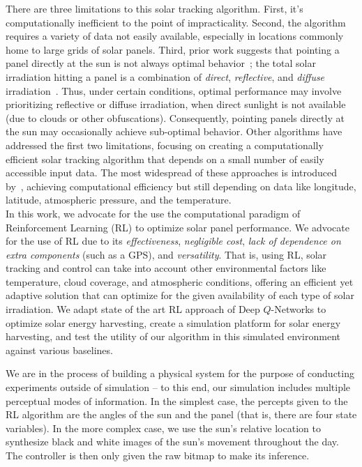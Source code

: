 \documentclass[11pt]{article}
\begin{document}
There are three limitations to this solar tracking algorithm. First, it's computationally inefficient to the point of impracticality. Second, the algorithm requires a variety of data not easily available, especially in locations commonly home to large grids of solar panels. Third, prior work suggests that pointing a panel directly at the sun is not always optimal behavior~\citet{Kelly2009,Hussein1995,King2001}; the total solar irradiation hitting a panel is a combination of {\it direct}, {\it reflective}, and {\it diffuse} irradiation~\cite{Benghanem2011}. Thus, under certain conditions, optimal performance may involve prioritizing reflective or diffuse irradiation, when direct sunlight is not available (due to clouds or other obfuscations). Consequently, pointing panels directly at the sun may  occasionally achieve sub-optimal behavior. Other algorithms have addressed the first two limitations, focusing on creating a computationally efficient solar tracking algorithm that depends on a small number of easily accessible input data. The most widespread of these approaches is introduced by~\citet{Grena2008}, achieving computational efficiency but still depending on data like longitude, latitude, atmospheric pressure, and the temperature. \\ 

In this work, we advocate for the use the computational paradigm of Reinforcement Learning (RL) to optimize solar panel performance. We advocate for the use of RL due to its {\it effectiveness}, {\it negligible cost}, {\it lack of dependence on extra components} (such as a GPS), and {\it versatility}. That is, using RL, solar tracking and control can take into account other environmental factors like temperature, cloud coverage, and atmospheric conditions, offering an efficient yet adaptive solution that can optimize for the given availability of each type of solar irradiation. We adapt state of the art RL approach of Deep $Q$-Networks to optimize solar energy harvesting, create a simulation platform for solar energy harvesting, and test the utility of our algorithm in this simulated environment against various baselines.

We are in the process of building a physical system for the purpose of conducting experiments outside of simulation -- to this end, our simulation includes multiple perceptual modes of information. In the simplest case, the percepts given to the RL algorithm are the angles of the sun and the panel (that is, there are four state variables). In the more complex case, we use the sun's relative location to synthesize black and white images of the sun's movement throughout the day. The controller is then only given the raw bitmap to make its inference. %
\end{document}
